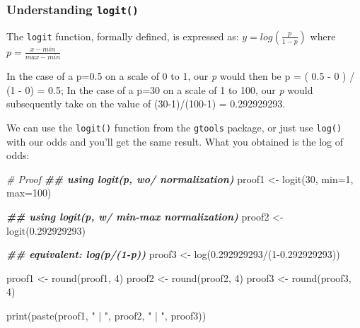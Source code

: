 \documentclass[
]{article}
\newenvironment{Shaded}{\begin{snugshade}}{\end{snugshade}}
\newcommand{\AttributeTok}[1]{\textcolor[rgb]{0.77,0.63,0.00}{#1}}
\newcommand{\CommentTok}[1]{\textcolor[rgb]{0.56,0.35,0.01}{\textit{#1}}}
\newcommand{\DecValTok}[1]{\textcolor[rgb]{0.00,0.00,0.81}{#1}}
\newcommand{\DocumentationTok}[1]{\textcolor[rgb]{0.56,0.35,0.01}{\textbf{\textit{#1}}}}
\newcommand{\FloatTok}[1]{\textcolor[rgb]{0.00,0.00,0.81}{#1}}
\newcommand{\FunctionTok}[1]{\textcolor[rgb]{0.00,0.00,0.00}{#1}}
\newcommand{\NormalTok}[1]{#1}
\newcommand{\OtherTok}[1]{\textcolor[rgb]{0.56,0.35,0.01}{#1}}
\newcommand{\SpecialCharTok}[1]{\textcolor[rgb]{0.00,0.00,0.00}{#1}}
\newcommand{\StringTok}[1]{\textcolor[rgb]{0.31,0.60,0.02}{#1}}
\begin{document}
\hypertarget{understanding-logit}{%
\subsubsection{\texorpdfstring{Understanding
\texttt{logit()}}{Understanding logit()}}\label{understanding-logit}}

The \texttt{logit} function, formally defined, is expressed as:
\(y = log(\frac{p}{1-p})\) where \(p = \frac{x - min}{max-min}\)

In the case of a p=0.5 on a scale of 0 to 1, our \emph{p} would then be
p = ( 0.5 - 0 ) / (1 - 0) = 0.5; In the case of a p=30 on a scale of 1
to 100, our \emph{p} would subsequently take on the value of
(30-1)/(100-1) = 0.292929293.

We can use the \texttt{logit()} function from the \texttt{gtools}
package, or just use \texttt{log()} with our odds and you'll get the
same result. What you obtained is the log of odds:

\begin{Shaded}
\begin{Highlighting}[]
\CommentTok{\# Proof}
\DocumentationTok{\#\# using logit(p, wo/ normalization)}
\NormalTok{proof1 }\OtherTok{\textless{}{-}} \FunctionTok{logit}\NormalTok{(}\DecValTok{30}\NormalTok{, }\AttributeTok{min=}\DecValTok{1}\NormalTok{, }\AttributeTok{max=}\DecValTok{100}\NormalTok{)}

\DocumentationTok{\#\# using logit(p, w/ min{-}max normalization)}
\NormalTok{proof2 }\OtherTok{\textless{}{-}} \FunctionTok{logit}\NormalTok{(}\FloatTok{0.292929293}\NormalTok{)}

\DocumentationTok{\#\# equivalent: log(p/(1{-}p))}
\NormalTok{proof3 }\OtherTok{\textless{}{-}} \FunctionTok{log}\NormalTok{(}\FloatTok{0.292929293}\SpecialCharTok{/}\NormalTok{(}\DecValTok{1}\FloatTok{{-}0.292929293}\NormalTok{))}

\NormalTok{proof1 }\OtherTok{\textless{}{-}} \FunctionTok{round}\NormalTok{(proof1, }\DecValTok{4}\NormalTok{)}
\NormalTok{proof2 }\OtherTok{\textless{}{-}} \FunctionTok{round}\NormalTok{(proof2, }\DecValTok{4}\NormalTok{)}
\NormalTok{proof3 }\OtherTok{\textless{}{-}} \FunctionTok{round}\NormalTok{(proof3, }\DecValTok{4}\NormalTok{)}

\FunctionTok{print}\NormalTok{(}\FunctionTok{paste}\NormalTok{(proof1, }\StringTok{" | "}\NormalTok{, proof2, }\StringTok{" | "}\NormalTok{, proof3))}
\end{Highlighting}
\end{Shaded}
\end{document}
